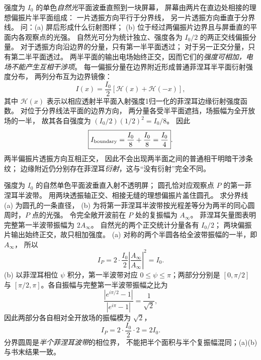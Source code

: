 
强度为 $I_0$ 的单色\emph{自然光}平面波垂直照到一块屏幕，
屏幕由两片在直边处相接的理想偏振片半平面组成：
一片透振方向平行于分界线，
另一片透振方向垂直于分界线。
问：(a) 屏后形成什么衍射图样；
(b) 位于经过两偏振片边界且与屏垂直的平面内各观察点的光强。
\exsolution
自然光可分为统计独立、强度各为 $I_0/2$ 的两正交线偏振分量。
对于透振方向沿边界的分量，只有第一半平面透过；
对于另一正交分量，只有第二半平面透过。
两半平面的输出电场始终正交，因而它们的\emph{强度可相加，电场不能产生互相干涉项}。
每一偏振分量在边界附近形成普通菲涅耳半平面衍射强度分布，
两列分布互为边界镜像：
\[
\boxed{I(x)=\frac{I_0}{2}
\left[\mathcal H(x)+\mathcal H(-x)\right]},
\]
其中 $\mathcal H(x)$ 表示以相应透射半平面入射强度1归一化的菲涅耳边缘衍射强度函数。
对位于分界线法平面的边界方向，
两分量各受半平面遮挡，场振幅为全开放场的一半，
故其各自强度为
$(I_0/2)(1/2)^2=I_0/8$。
因此
\[
\boxed{I_{\rm boundary}=
\frac{I_0}{8}+\frac{I_0}{8}
=\frac{I_0}{4}}.
\]
\excheck 两半偏振片透振方向互相正交，
因此不会出现两半面之间的普通相干明暗干涉条纹；
边缘附近仍分别存在菲涅耳\emph{衍射}，这与“没有衍射”完全不同。


强度为 $I_0$ 的自然单色平面波垂直入射不透明屏；
圆孔恰对应观察点 $P$ 的第一菲涅耳半波带。
用两块透振轴正交、相接无缝的理想偏振片盖住圆孔。
求分界线 (a) 为圆孔的一条直径，
(b) 为将第一菲涅耳半波带按光程差等分为两半的同心圆周时，$P$ 点的光强。
\exsolution
令完全敞开波前在 $P$ 处的复振幅为 $A_\infty$。
菲涅耳矢量图表明完整第一半波带振幅为 $2A_\infty$。
自然光的两个正交统计分量各有 $I_0/2$；
两块偏振片输出始终正交，故只相加强度。
(a) 对称的两个半圆各给全波带振幅的一半，即 $A_\infty$，
所以
\[
 I_P=2\cdot\frac{I_0}{2}
 \left|\frac{A_\infty}{A_\infty}\right|^2
 =\boxed{I_0}.
\]
(b) 以菲涅耳相位 $\psi$ 积分，第一半波带对应
$0\le\psi\le\pi$；两部分分别是 $[0,\pi/2]$ 与
$[\pi/2,\pi]$。各自振幅与完整第一半波带振幅之比为
\[
 \frac{|e^{i\pi/2}-1|}{|e^{i\pi}-1|}=\frac1{\sqrt2},
\]
因此两部分各自相对全开放场的振幅模为 $\sqrt2$，
\[
 I_P=2\cdot\frac{I_0}{2}\cdot 2
 =\boxed{2I_0}.
\]
\excheck 分界圆周是\emph{半个菲涅耳波带}的相位界，
不能把半个面积与半个复振幅混同；(a)(b) 与书末结果一致。

